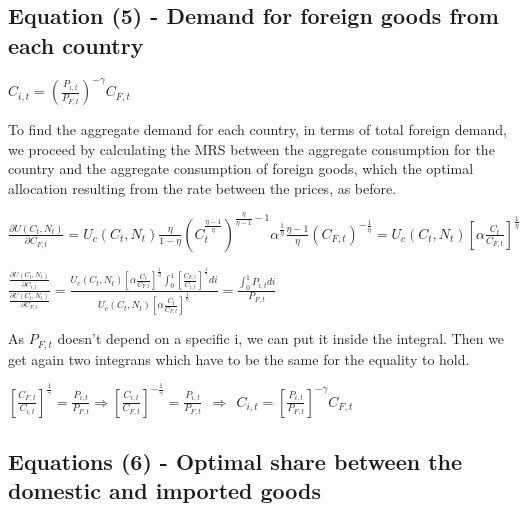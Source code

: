 \documentclass[
]{article}
\begin{document}
\vspace{12pt}

\hypertarget{equation-5---demand-for-foreign-goods-from-each-country}{%
\subsection{Equation (5) - Demand for foreign goods from each
country}\label{equation-5---demand-for-foreign-goods-from-each-country}}

\(\displaystyle C_{i,t}= \left( \frac{P_{i,t}}{P_{F,t}}\right)^{-\gamma}C_{F,t}\)

\vspace{8pt}

To find the aggregate demand for each country, in terms of total foreign
demand, we proceed by calculating the MRS between the aggregate
consumption for the country and the aggregate consumption of foreign
goods, which the optimal allocation resulting from the rate between the
prices, as before.

\(\displaystyle \frac{\partial U(C_t,N_t)}{\partial C_{F,t}} = U_c(C_t,N_t)\frac{\eta}{1-\eta}\left( C_t^{\frac{\eta-1}{\eta}} \right)^{\frac{\eta}{\eta-1}-1} \alpha^{\frac{1}{\eta}}\frac{\eta-1}{\eta}\left( C_{F,t}\right)^{-\frac{1}{\eta}} = U_c(C_t,N_t) \left[ \alpha \frac{C_t}{C_{F,t}} \right]^{\frac{1}{\eta}}\)

\(\displaystyle \frac{\displaystyle \frac{\partial U(C_t,N_t)}{\displaystyle \partial C_{i,t}}}{\frac{\displaystyle \partial U(C_t,N_t)}{\displaystyle \partial C_{F,t}}} = \frac{\displaystyle U_c(C_t,N_t) \left[ \alpha \frac{C_t}{C_{F,t}} \right]^{\frac{1}{\eta}} \int_0^1 \left[\frac{C_{F,t}}{C_{i,t}}\right]^{\frac{1}{\gamma}} di }{\displaystyle U_c(C_t,N_t) \left[ \alpha \frac{C_t}{C_{F,t}} \right]^{\frac{1}{\eta}} } = \frac{\displaystyle \int_0^1P_{i,t}di}{P_{F,t}}\)

As \(P_{F,t}\) doesn't depend on a specific i, we can put it inside the
integral. Then we get again two integrans which have to be the same for
the equality to hold.

\(\displaystyle \left[\frac{C_{F,t}}{C_{i,t}}\right]^{\frac{1}{\gamma}} = \frac{P_{i,t}}{P_{F,t}} \Rightarrow \left[\frac{C_{i,t}}{C_{F,t}}\right]^{-\frac{1}{\gamma}} = \frac{P_{i,t}}{P_{F,t}} \ \ \Rightarrow \ \ C_{i,t} = \left[ \frac{P_{i,t}}{P_{F,t}} \right]^{-\gamma}C_{F,t}\)

\vspace{12pt}

\hypertarget{equations-6---optimal-share-between-the-domestic-and-imported-goods}{%
\subsection{Equations (6) - Optimal share between the domestic and
imported
goods}\label{equations-6---optimal-share-between-the-domestic-and-imported-goods}}
\end{document}
